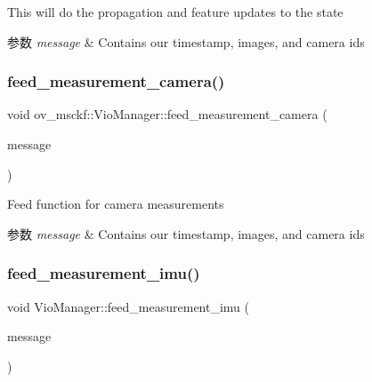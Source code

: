 This will do the propagation and feature updates to the state 


\begin{DoxyParams}{参数}
{\em message} & Contains our timestamp, images, and camera ids \\
\hline
\end{DoxyParams}
\mbox{\label{classov__msckf_1_1VioManager_a96cd1d24579772a7e1f6c6ff068dc489}} 
\subsubsection{\texorpdfstring{feed\+\_\+measurement\+\_\+camera()}{feed\_measurement\_camera()}}
{\footnotesize\ttfamily void ov\+\_\+msckf\+::\+Vio\+Manager\+::feed\+\_\+measurement\+\_\+camera (\begin{DoxyParamCaption}\item[{const \hyperlink{structov__core_1_1CameraData}{ov\+\_\+core\+::\+Camera\+Data} \&}]{message }\end{DoxyParamCaption})\hspace{0.3cm}{\ttfamily [inline]}}



Feed function for camera measurements 


\begin{DoxyParams}{参数}
{\em message} & Contains our timestamp, images, and camera ids \\
\hline
\end{DoxyParams}
\mbox{\label{classov__msckf_1_1VioManager_a5e7dde1c28eb800c663fb2e238cc60ea}} 
\subsubsection{\texorpdfstring{feed\+\_\+measurement\+\_\+imu()}{feed\_measurement\_imu()}}
{\footnotesize\ttfamily void Vio\+Manager\+::feed\+\_\+measurement\+\_\+imu (\begin{DoxyParamCaption}\item[{const \hyperlink{structov__core_1_1ImuData}{ov\+\_\+core\+::\+Imu\+Data} \&}]{message }\end{DoxyParamCaption})}



